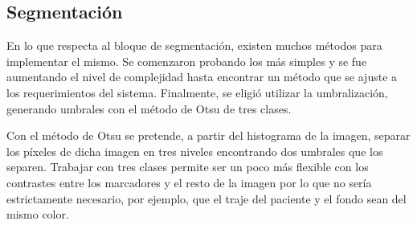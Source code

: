 \subsection{Segmentación}
En lo que respecta al bloque de segmentación, existen muchos métodos para implementar el mismo. Se comenzaron probando los más simples y se fue aumentando el nivel de complejidad hasta encontrar un método que se ajuste a los requerimientos del sistema. Finalmente, se eligió utilizar la umbralización, generando umbrales con el método de Otsu\cite{otsu} de tres clases.

Con el método de Otsu \cite{otsu} se pretende, a partir del histograma de la imagen, separar los píxeles de dicha imagen en tres niveles encontrando dos umbrales que los separen. Trabajar con tres clases permite ser un poco más flexible con los contrastes entre los marcadores y el resto de la imagen por lo que no sería estrictamente necesario, por ejemplo, que el traje del paciente y el fondo sean del mismo color.

